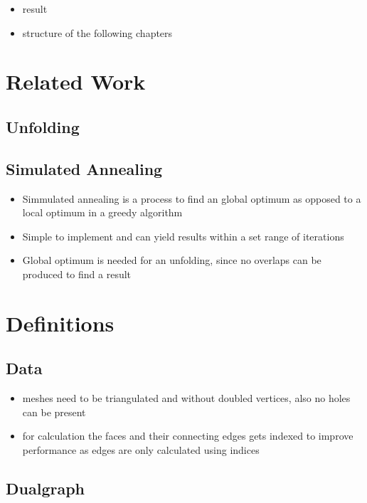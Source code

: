 \documentclass[draft,final]{vutinfth} %
\begin{document}
\begin{itemize}
	\item result
\end{itemize}

\begin{itemize}
	\item structure of the following chapters
\end{itemize}

\chapter{Related Work}

\section{Unfolding}

\section{Simulated Annealing}

\begin{itemize}
	\item Simmulated annealing is a process to find an global optimum as opposed to a local optimum in a greedy algorithm
	\item Simple to implement and can yield results within a set range of iterations
	\item Global optimum is needed for an unfolding, since no overlaps can be produced to find a result
\end{itemize}

\chapter{Definitions}

\section{Data}

\begin{itemize}
	\item meshes need to be triangulated and without doubled vertices, also no holes can be present
	\item for calculation the faces and their connecting edges gets indexed to improve performance as edges are only calculated using indices
\end{itemize}

\section{Dualgraph}
\end{document}
